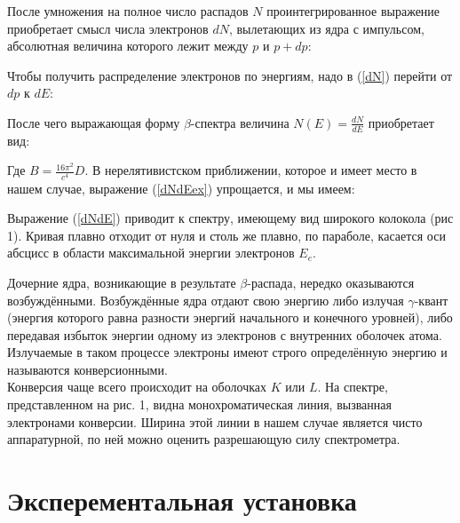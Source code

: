 После умножения на полное число распадов $ N $ проинтегрированное выражение
приобретает смысл числа электронов $ dN $, вылетающих из ядра с импульсом,
абсолютная величина которого лежит между $ p $ и $ p + dp $:


Чтобы получить распределение электронов по энергиям, надо в (\ref{dN}) перейти
от $ dp $ к $ dE $:


После чего выражающая форму $ \beta $-спектра величина $ N(E) = \frac{dN}{dE} $
приобретает вид:


Где $ B = \frac{16\pi^2}{c^4}D $. В нерелятивистском приближении, которое и имеет
место в нашем случае, выражение (\ref{dNdEex}) упрощается, и мы имеем:


Выражение (\ref{dNdE}) приводит к спектру, имеющему вид широкого колокола (рис 1).
Кривая плавно отходит от нуля и столь же плавно, по параболе, касается оси абсцисс в
области максимальной энергии электронов $ E_e $.


Дочерние ядра, возникающие в результате $ \beta $-распада, нередко оказываются
возбуждёнными. Возбуждённые ядра отдают свою энергию либо излучая $ \gamma $-квант
(энергия которого равна разности энергий начального и конечного уровней), либо
передавая избыток энергии одному из электронов с внутренних оболочек атома.
Излучаемые в таком процессе электроны имеют строго определённую энергию и
называются конверсионными. \\

Конверсия чаще всего происходит на оболочках $ K $ или $ L $. На спектре, представленном на
рис. 1, видна монохроматическая линия, вызванная электронами конверсии. Ширина этой линии
в нашем случае является чисто аппаратурной, по ней можно оценить разрешающую силу спектрометра.

\newpage

\section{Эксперементальная установка}

